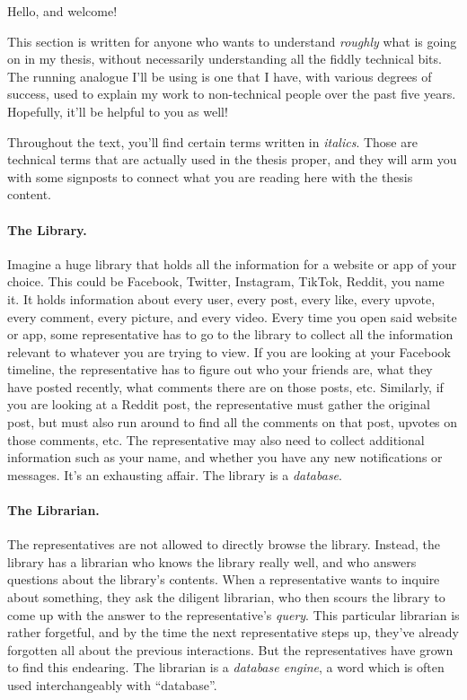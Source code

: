 Hello, and welcome!

This section is written for anyone who wants to understand \emph{roughly} what
is going on in my thesis, without necessarily understanding all the fiddly
technical bits. The running analogue I'll be using is one that I have, with
various degrees of success, used to explain my work to non-technical people over
the past five years. Hopefully, it'll be helpful to you as well!

Throughout the text, you'll find certain terms written in \textit{italics}.
Those are technical terms that are actually used in the thesis proper, and they
will arm you with some signposts to connect what you are reading here with the
thesis content.

\paragraph{The Library.}
%
Imagine a huge library that holds all the information for a website or app of
your choice. This could be Facebook, Twitter, Instagram, TikTok, Reddit, you
name it. It holds information about every user, every post, every like, every
upvote, every comment, every picture, and every video. Every time you open said
website or app, some representative has to go to the library to collect all the
information relevant to whatever you are trying to view. If you are looking at
your Facebook timeline, the representative has to figure out who your friends
are, what they have posted recently, what comments there are on those posts,
etc. Similarly, if you are looking at a Reddit post, the representative must
gather the original post, but must also run around to find all the comments on
that post, upvotes on those comments, etc. The representative may also need to
collect additional information such as your name, and whether you have any new
notifications or messages. It's an exhausting affair. The library is a
\textit{database}.

\paragraph{The Librarian.}
%
The representatives are not allowed to directly browse the library. Instead, the
library has a librarian who knows the library really well, and who answers
questions about the library's contents. When a representative wants to inquire
about something, they ask the diligent librarian, who then scours the library to
come up with the answer to the representative's \textit{query}. This particular
librarian is rather forgetful, and by the time the next representative steps up,
they've already forgotten all about the previous interactions. But the
representatives have grown to find this endearing. The librarian is a
\textit{database engine}, a word which is often used interchangeably with
``database''.

